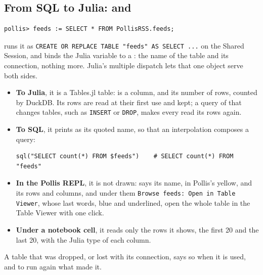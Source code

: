 \subsection{From SQL to Julia: \texorpdfstring{}{name :=} and \texorpdfstring{}{PollisDB.Table}}
\begin{lstlisting}
pollis> feeds := SELECT * FROM PollisRSS.feeds;
\end{lstlisting}
 runs it as \texttt{\small CREATE OR REPLACE TABLE "feeds" AS SELECT ...} on the Shared
Session, and binds the Julia variable  to a : the name of the table and its
connection, nothing more. Julia's multiple dispatch lets that one object serve both sides.
\begin{itemize}
  \item \textbf{To Julia}, it is a Tables.jl table:  is a column, and  its
    number of rows, counted by DuckDB. Its rows are read at their first use and kept; a query of  that
    changes tables, such as \texttt{\small INSERT} or \texttt{\small DROP}, makes every  read its rows again.
  \item \textbf{To SQL}, it prints as its quoted name, so that an interpolation composes a query:
\begin{lstlisting}
sql("SELECT count(*) FROM $feeds")    # SELECT count(*) FROM "feeds"
\end{lstlisting}
  \item \textbf{In the Pollis REPL}, it is not drawn:  says its name, in Pollis's yellow, and its
    rows and columns, and under them \texttt{\small Browse feeds: Open in Table Viewer}, whose last words, blue and
    underlined, open the whole table in the Table Viewer with one click.
  \item \textbf{Under a notebook cell}, it reads only the rows it shows, the first 20 and the last 20, with the Julia
    type of each column.
\end{itemize}
A table that was dropped, or lost with its connection, says so when it is used, and to run again what made it.

